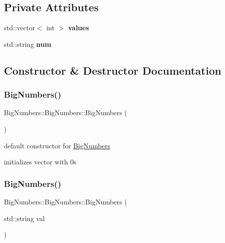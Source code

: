 \subsection*{Private Attributes}
\begin{DoxyCompactItemize}
\item 
\mbox{\label{class_big_numbers_1_1_big_numbers_adbe7d06479f9e3e4d21a37875e8977a5}} 
std\+::vector$<$ int $>$ {\bfseries values}
\item 
\mbox{\label{class_big_numbers_1_1_big_numbers_a2d431ac02832d25cbbdafb8391ef78f3}} 
std\+::string {\bfseries num}
\end{DoxyCompactItemize}


\subsection{Constructor \& Destructor Documentation}
\mbox{\label{class_big_numbers_1_1_big_numbers_a87037d5faa0bf5253b6e8fc7fc54324c}} 
\subsubsection{\texorpdfstring{BigNumbers()}{BigNumbers()}\hspace{0.1cm}{\footnotesize\ttfamily [1/2]}}
{\footnotesize\ttfamily Big\+Numbers\+::\+Big\+Numbers\+::\+Big\+Numbers (\begin{DoxyParamCaption}{ }\end{DoxyParamCaption})}

default constructor for \mbox{\hyperlink{class_big_numbers_1_1_big_numbers}{Big\+Numbers}}

initializes vector with 0\textquotesingle{}s \mbox{\label{class_big_numbers_1_1_big_numbers_a4dcfaac3c63a377ef04a6b5e6bd2fc68}} 
\subsubsection{\texorpdfstring{BigNumbers()}{BigNumbers()}\hspace{0.1cm}{\footnotesize\ttfamily [2/2]}}
{\footnotesize\ttfamily Big\+Numbers\+::\+Big\+Numbers\+::\+Big\+Numbers (\begin{DoxyParamCaption}\item[{std\+::string}]{val }\end{DoxyParamCaption})}

